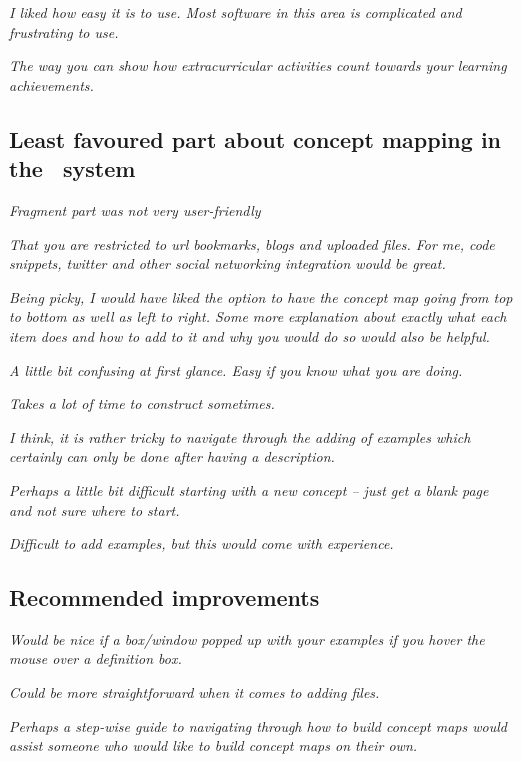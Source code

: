 \textit{I liked how easy it is to use. Most software in this area is complicated
and frustrating to use.}

\textit{The way you can show how extracurricular activities count towards your
learning achievements.}


\subsection{Least favoured part about concept mapping in the \ep~system}

\textit{Fragment part was not very user-friendly}

\textit{That you are restricted to url bookmarks, blogs and uploaded files. For
me, code snippets, twitter and other social networking integration would be
great.}

\textit{Being picky, I would have liked the option to have the concept map going
from top to bottom as well as left to right. Some more explanation about exactly
what each item does and how to add to it and why you would do so would also be
helpful.}

\textit{A little bit confusing at first glance. Easy if you know what you are
doing.}

\textit{Takes a lot of time to construct sometimes.}

\textit{I think, it is rather tricky to navigate through the adding of examples
which certainly can only be done after having a description.}

\textit{Perhaps a little bit difficult starting with a new concept -- just get a
blank page and not sure where to start.}

\textit{Difficult to add examples, but this would come with experience.}


\subsection{Recommended improvements}

\textit{Would be nice if a box/window popped up with your examples if you hover
the mouse over a definition box.}

\textit{Could be more straightforward when it comes to adding files.}

\textit{Perhaps a step-wise guide to navigating through how to build concept
maps would assist someone who would like to build concept maps on their own.}

